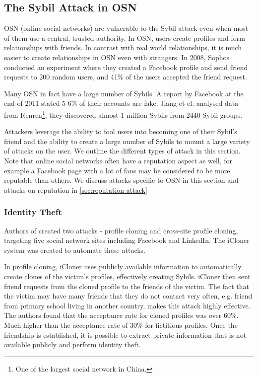 \subsection{The Sybil Attack in OSN}
OSN (online social networks) are vulnerable to the Sybil attack even when most
of them use a central, trusted authority. In OSN, users create
profiles and form relationships with friends. In contrast with real world
relationships, it is much easier to create relationships in OSN even with
strangers. In 2008, Sophos conducted an experiment where they created a Facebook
profile and send friend requests to 200 random users, and 41\% of the users
accepted the friend request\cite{sophos}.

Many OSN in fact have a large number of Sybils. A report by Facebook at the end
of 2011 stated 5-6\% of their accounts are fake\cite{facebookfake}. Jiang et el.
analysed data from Renren\footnote{One of the largest social network in China.},
they discovered almost 1 million Sybils from 2440 Sybil
groups\cite{jiang2015understanding}.

Attackers leverage the ability to fool users into becoming one of their Sybil's
friend and the ability to create a large number of Sybils to mount a large
variety of attacks on the user. We outline the different types of attack in this
section. Note that online social networks often have a reputation aspect as
well, for example a Facebook page with a lot of fans may be considered to be
more reputable than others. We discuss attacks specific to OSN in this section
and attacks on reputation in \autoref{sec:reputation-attack}

\subsubsection{Identity Theft}
Authors of \cite{bilge2009all} created two attacks - profile cloning and
cross-site profile cloning, targeting five social network sites including
Facebook and LinkedIn. The iCloner system was created to automate these
attacks.

In profile cloning, iCloner uses publicly available information to automatically
create clones of the victim's profiles, effectively creating Sybils. iCloner
then sent friend requests from the cloned profile to the friends of the victim.
The fact that the victim may have many friends that they do not contact very
often, e.g. friend from primary school living in another country, makes this
attack highly effective. The authors found that the acceptance rate for cloned
profiles was over 60\%. Much higher than the acceptance rate of 30\% for
fictitious profiles. Once the friendship is established, it is possible to
extract private information that is not available publicly and perform identity
theft.

